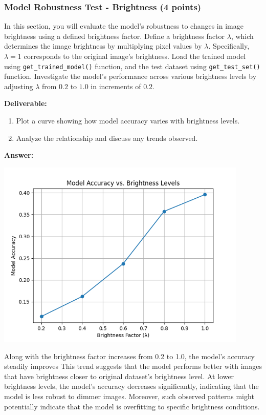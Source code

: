 \documentclass[11pt, oneside]{article}   	%
\begin{document}
\subsubsection*{Model Robustness Test - Brightness (4 points)}
In this section, you will evaluate the model's robustness to changes in image brightness using a defined brightness factor.
Define a brightness factor $\lambda$, which determines the image brightness by multiplying pixel values by $\lambda$. Specifically, $\lambda = 1$ corresponds to the original image's brightness.
Load the trained model using \texttt{get\_trained\_model()} function, and the test dataset using \texttt{get\_test\_set()} function.  Investigate the model's performance across various brightness levels by adjusting $\lambda$ from $0.2$ to $1.0$ in increments of $0.2$. 

\noindent\textbf{Deliverable:}

\begin{enumerate}
    \item Plot a curve showing how model accuracy varies with brightness levels.
    \item Analyze the relationship and discuss any trends observed.
\end{enumerate}


\textbf{Answer:} 
\begin{center}
    \includegraphics[width=0.9\textwidth]{report_pic/Brightness_accuracy.png}
\end{center}
Along with the brightness factor increases from 0.2 to 1.0, the model's accuracy steadily improves
This trend suggests that the model performs better with images that have brightness closer to original dataset's brightness level.
At lower brightness levels, the model's accuracy decreases significantly, indicating that the model is less robust to dimmer images.
Moreover, such observed patterns might potentially indicate that the model is overfitting to specific brightness conditions.
\end{document}
